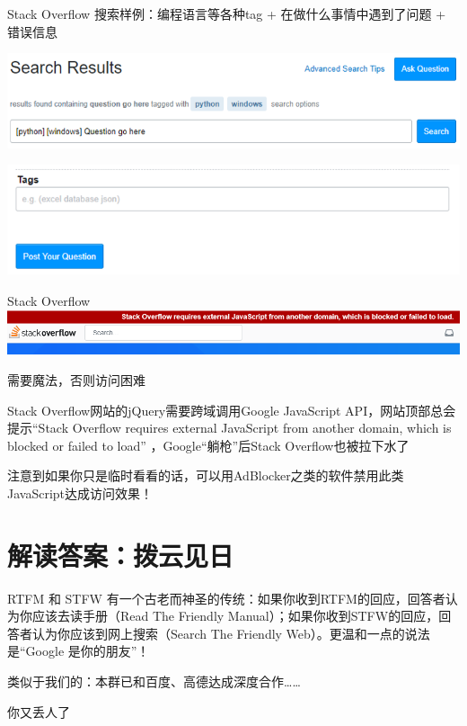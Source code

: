 \documentclass[10pt]{beamer}
\begin{document}
\begin{frame}[fragile]{Stack Overflow}
    搜索样例：编程语言等各种tag + 在做什么事情中遇到了问题 + 错误信息

    \includegraphics[width=\textwidth]{pic/search-results.png}

    \includegraphics[width=\textwidth]{pic/tags.png}
\end{frame}

\begin{frame}[fragile]{Stack Overflow}
    \includegraphics[width=\textwidth]{pic/stack-overflow.png}

    需要魔法，否则访问困难

    Stack Overflow网站的jQuery需要跨域调用Google JavaScript API，网站顶部总会提示“Stack Overflow requires external JavaScript from another domain, which is blocked or failed to load” ，Google“躺枪”后Stack Overflow也被拉下水了

    注意到如果你只是临时看看的话，可以用AdBlocker之类的软件禁用此类JavaScript达成访问效果！
\end{frame}

\section{解读答案：拨云见日}

\begin{frame}[fragile]{RTFM 和 STFW}
    有一个古老而神圣的传统：如果你收到RTFM的回应，回答者认为你应该去读手册（Read The Friendly Manual）；如果你收到STFW的回应，回答者认为你应该到网上搜索（Search The Friendly Web）。更温和一点的说法是“Google 是你的朋友”！

    类似于我们的：本群已和百度、高德达成深度合作……

    你又丢人了
\end{frame}
\end{document}
